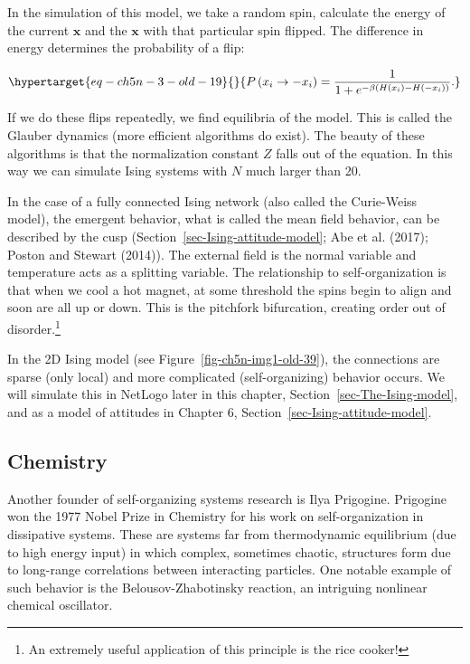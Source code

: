 \documentclass[
  a4paper,
  DIV=11,
  numbers=noendperiod,
  oneside]{scrreprt}
\begin{document}
In the simulation of this model, we take a random spin, calculate the
energy of the current \(\mathbf{x}\) and the \(\mathbf{x}\) with that
particular spin flipped. The difference in energy determines the
probability of a flip:

\begin{equation}\protect\hypertarget{eq-ch5n-3-old-19}{}{
P\left( x_{i} \rightarrow - x_{i} \right) = \frac{1}{ 1 + e^{- \beta\left( H\left( x_{i} \right) - H\left( - x_{i} \right) \right)}}.}\label{eq-ch5n-3-old-19}\end{equation}

If we do these flips repeatedly, we find equilibria of the model. This
is called the Glauber dynamics (more efficient algorithms do exist). The
beauty of these algorithms is that the normalization constant \(Z\)
falls out of the equation. In this way we can simulate Ising systems
with \(N\) much larger than 20.

In the case of a fully connected Ising network (also called the
Curie-Weiss model), the emergent behavior, what is called the mean field
behavior, can be described by the cusp
(Section~\ref{sec-Ising-attitude-model}; Abe et al. (2017); Poston and
Stewart (2014)). The external field is the normal variable and
temperature acts as a splitting variable. The relationship to
self-organization is that when we cool a hot magnet, at some threshold
the spins begin to align and soon are all up or down. This is the
pitchfork bifurcation, creating order out of disorder.\footnote{An
  extremely useful application of this principle is the rice cooker!}

In the 2D Ising model (see Figure~\ref{fig-ch5n-img1-old-39}), the
connections are sparse (only local) and more complicated
(self-organizing) behavior occurs. We will simulate this in NetLogo
later in this chapter, Section~\ref{sec-The-Ising-model}, and as a model
of attitudes in Chapter 6, Section~\ref{sec-Ising-attitude-model}.

\hypertarget{sec-Chemistry}{%
\subsection{Chemistry}\label{sec-Chemistry}}

Another founder of self-organizing systems research is Ilya Prigogine.
Prigogine won the 1977 Nobel Prize in Chemistry for his work on
self-organization in dissipative systems. These are systems far from
thermodynamic equilibrium (due to high energy input) in which complex,
sometimes chaotic, structures form due to long-range correlations
between interacting particles. One notable example of such behavior is
the Belousov-Zhabotinsky reaction, an intriguing nonlinear chemical
oscillator.
\end{document}
